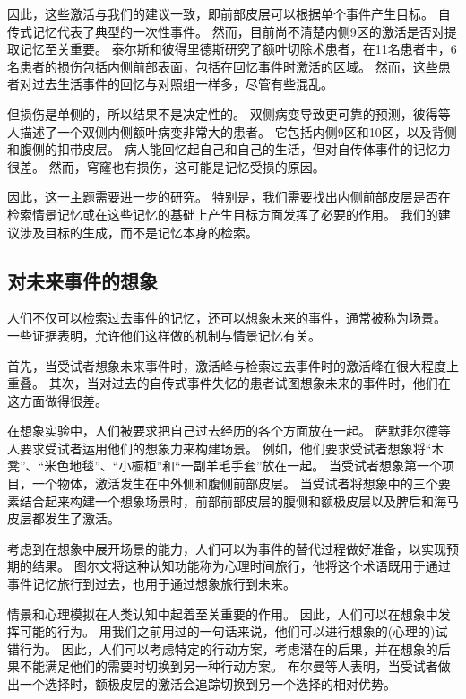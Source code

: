 因此，这些激活与我们的建议一致，即前部皮层可以根据单个事件产生目标。
自传式记忆代表了典型的一次性事件。
然而，目前尚不清楚内侧9区的激活是否对提取记忆至关重要。
泰尔斯和彼得里德斯\cite{thaiss2008autobiographical}研究了额叶切除术患者，在11名患者中，6名患者的损伤包括内侧前部表面，包括在回忆事件时激活的区域。
然而，这些患者对过去生活事件的回忆与对照组一样多，尽管有些混乱。
\par


但损伤是单侧的，所以结果不是决定性的。
双侧病变导致更可靠的预测，彼得等人\cite{bird2004impact}描述了一个双侧内侧额叶病变非常大的患者。
它包括内侧9区和10区，以及背侧和腹侧的扣带皮层。
病人能回忆起自己和自己的生活，但对自传体事件的记忆力很差。
然而，穹窿也有损伤，这可能是记忆受损的原因。
\par


因此，这一主题需要进一步的研究。
特别是，我们需要找出内侧前部皮层是否在检索情景记忆或在这些记忆的基础上产生目标方面发挥了必要的作用。
我们的建议涉及目标的生成，而不是记忆本身的检索。
\par



\subsection{对未来事件的想象}
\par
人们不仅可以检索过去事件的记忆，还可以想象未来的事件，通常被称为场景。
一些证据表明，允许他们这样做的机制与情景记忆有关\cite{addis2007remembering}。


首先，当受试者想象未来事件时，激活峰与检索过去事件时的激活峰在很大程度上重叠\cite{hassabis2007using}。
其次，当对过去的自传式事件失忆的患者试图想象未来的事件时，他们在这方面做得很差\cite{hassabis2007patients}。


在想象实验中，人们被要求把自己过去经历的各个方面放在一起\cite{schacter2007remembering}。
萨默菲尔德等人\cite{summerfield2010differential}要求受试者运用他们的想象力来构建场景。
例如，他们要求受试者想象将“木凳”、“米色地毯”、“小橱柜”和“一副羊毛手套”放在一起。
当受试者想象第一个项目，一个物体，激活发生在中外侧和腹侧前部皮层。
当受试者将想象中的三个要素结合起来构建一个想象场景时，前部前部皮层的腹侧和额极皮层以及脾后和海马皮层都发生了激活。


考虑到在想象中展开场景的能力，人们可以为事件的替代过程做好准备，以实现预期的结果。
图尔文\cite{tulving2005episodic}将这种认知功能称为心理时间旅行，他将这个术语既用于通过事件记忆旅行到过去，也用于通过想象旅行到未来。


情景和心理模拟在人类认知中起着至关重要的作用。
因此，人们可以在想象中发挥可能的行为。
用我们之前用过的一句话来说，他们可以进行想象的(心理的)试错行为。
因此，人们可以考虑特定的行动方案，考虑潜在的后果，并在想象的后果不能满足他们的需要时切换到另一种行动方案。
布尔曼等人\cite{boorman2009green}表明，当受试者做出一个选择时，额极皮层的激活会追踪切换到另一个选择的相对优势。


